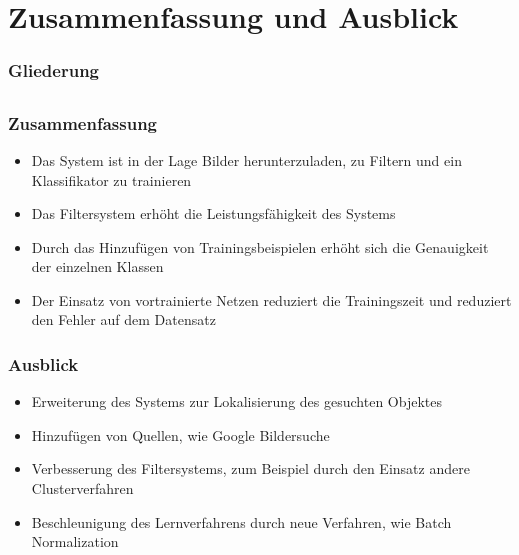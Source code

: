 \documentclass[utf8]{beamer}
\begin{document}
\section[Abschluss]{Zusammenfassung und Ausblick}

\begin{frame}
    \frametitle{Gliederung}
    \tableofcontents[currentsection]
\end{frame}

\subsection{}

\begin{frame}
    \frametitle{Zusammenfassung}
    \begin{center}
        \begin{itemize}
          \item Das System ist in der Lage Bilder herunterzuladen, zu Filtern und ein Klassifikator zu trainieren
          \item Das Filtersystem erhöht die Leistungsfähigkeit des Systems
          \item Durch das Hinzufügen von Trainingsbeispielen erhöht sich die Genauigkeit der einzelnen Klassen
          \item Der Einsatz von vortrainierte Netzen reduziert die Trainingszeit und reduziert den Fehler auf dem Datensatz
        \end{itemize}
    \end{center}
\end{frame}

\begin{frame}
    \frametitle{Ausblick}
    \begin{center}
        \begin{itemize}
          \item Erweiterung des Systems zur Lokalisierung des gesuchten Objektes
          \item Hinzufügen von Quellen, wie Google Bildersuche
          \item Verbesserung des Filtersystems, zum Beispiel durch den Einsatz andere Clusterverfahren
          \item Beschleunigung des Lernverfahrens durch neue Verfahren, wie Batch Normalization
        \end{itemize}
    \end{center}
\end{frame}
\end{document}
